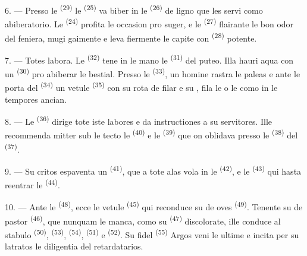 6. --- Presso le  \textsuperscript{(29)} le 
\textsuperscript{(25)} va biber in le  \textsuperscript{(26)} de
ligno que les servi como abiberatorio. Le 
\textsuperscript{(24)} profita le occasion pro suger, e le 
\textsuperscript{(27)} flairante le bon odor del feniera, mugi gaimente e leva
fiermente le capite con  \textsuperscript{(28)} potente.

7. --- Totes labora. Le  \textsuperscript{(32)} tene in le
mano le  \textsuperscript{(31)} del puteo. Illa hauri aqua con un
 \textsuperscript{(30)} pro abiberar le bestial. Presso le
 \textsuperscript{(33)}, un homine rastra le paleas e ante le
porta del  \textsuperscript{(34)} un vetule 
\textsuperscript{(35)} con su rota de filar e su , fila le
 o le  como in le tempores ancian.

\VUsaut{3.0mm}
\VUsaut{3.0mm}

8. --- Le  \textsuperscript{(36)} dirige tote iste labores e da
instructiones a su servitores. Ille recommenda mitter sub le tecto le
 \textsuperscript{(40)} e le  \textsuperscript{(39)}
que on oblidava presso le  \textsuperscript{(38)} del 
\textsuperscript{(37)}.

9. --- Su critos espaventa un  \textsuperscript{(41)}, que a
tote alas vola in le  \textsuperscript{(42)}, e le
 \textsuperscript{(43)} qui hasta reentrar le 
\textsuperscript{(44)}.

10. --- Ante le  \textsuperscript{(48)}, ecce le vetule
 \textsuperscript{(45)} qui reconduce su  de oves
\textsuperscript{(49)}. Tenente su  de pastor
\textsuperscript{(46)}, que nunquam le manca, como su 
\textsuperscript{(47)} discolorate, ille conduce al stabulo 
\textsuperscript{(50)},  \textsuperscript{(53)}, 
\textsuperscript{(54)},  \textsuperscript{(51)} e
 \textsuperscript{(52)}. Su fidel 
\textsuperscript{(55)} Argos veni le ultime e incita per su latratos le
diligentia del retardatarios.

